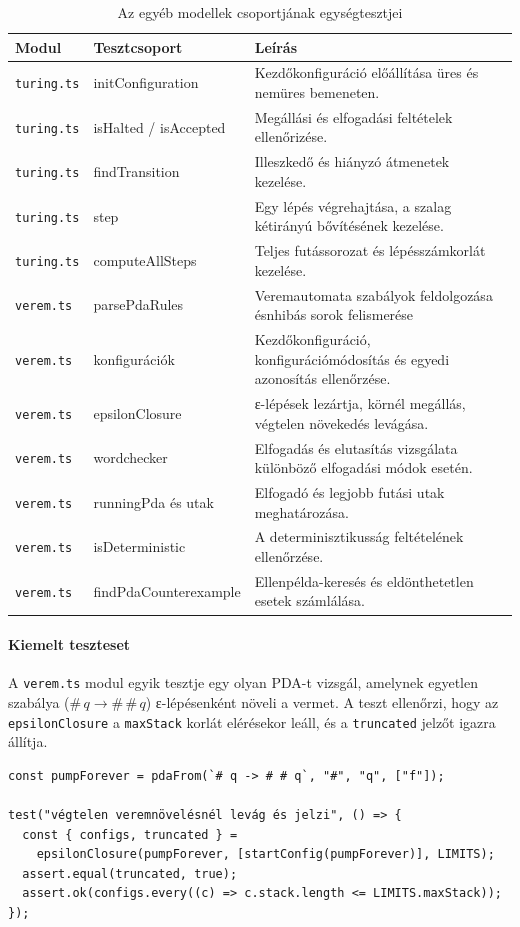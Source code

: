 \begin{table}[H]
    \centering
    \begin{tabularx}{\textwidth}{|l|l|X|}
        \hline
        \textbf{Modul} & \textbf{Tesztcsoport} & \textbf{Leírás} \\ \hline
        \texttt{turing.ts} & initConfiguration & Kezdőkonfiguráció előállítása üres és nemüres bemeneten. \\ \hline
        \texttt{turing.ts} & isHalted / isAccepted & Megállási és elfogadási feltételek ellenőrizése. \\ \hline
        \texttt{turing.ts} & findTransition & Illeszkedő és hiányzó átmenetek kezelése. \\ \hline
        \texttt{turing.ts} & step & Egy lépés végrehajtása, a szalag kétirányú bővítésének kezelése. \\ \hline
        \texttt{turing.ts} & computeAllSteps & Teljes futássorozat és lépésszámkorlát kezelése. \\ \hline
        \texttt{verem.ts} & parsePdaRules & Veremautomata szabályok feldolgozása ésnhibás sorok felismerése \\ \hline
        \texttt{verem.ts} & konfigurációk & Kezdőkonfiguráció, konfigurációmódosítás és egyedi azonosítás ellenőrzése.\\ \hline
        \texttt{verem.ts} & epsilonClosure & ε-lépések lezártja, körnél megállás, végtelen növekedés levágása. \\ \hline
        \texttt{verem.ts} & wordchecker & Elfogadás és elutasítás vizsgálata különböző elfogadási módok esetén. \\ \hline
        \texttt{verem.ts} & runningPda és utak & Elfogadó és legjobb futási utak meghatározása. \\ \hline
        \texttt{verem.ts} & isDeterministic & A determinisztikusság feltételének ellenőrzése. \\ \hline
        \texttt{verem.ts} & findPdaCounterexample & Ellenpélda-keresés és eldönthetetlen esetek számlálása. \\ \hline
    \end{tabularx}
    \caption{Az egyéb modellek csoportjának egységtesztjei}
    \label{tab:test_models}
\end{table}

\paragraph{Kiemelt teszteset} A \texttt{verem.ts} modul egyik tesztje egy olyan PDA-t vizsgál, amelynek egyetlen szabálya ($\# \, q \to \# \, \# \, q$) ε-lépésenként növeli a vermet. A teszt ellenőrzi, hogy az \texttt{epsilonClosure} a \texttt{maxStack} korlát elérésekor leáll, és a \texttt{truncated} jelzőt igazra állítja.
\begin{lstlisting}
const pumpForever = pdaFrom(`# q -> # # q`, "#", "q", ["f"]);

test("végtelen veremnövelésnél levág és jelzi", () => {
  const { configs, truncated } =
    epsilonClosure(pumpForever, [startConfig(pumpForever)], LIMITS);
  assert.equal(truncated, true);
  assert.ok(configs.every((c) => c.stack.length <= LIMITS.maxStack));
});
\end{lstlisting}

